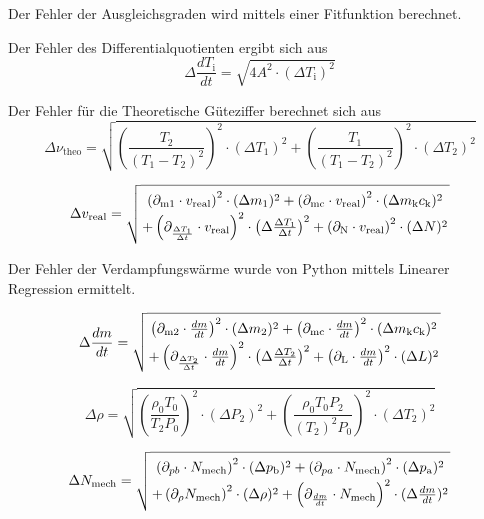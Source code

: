 Der Fehler der Ausgleichsgraden wird mittels einer Fitfunktion berechnet.

Der Fehler des Differentialquotienten ergibt sich aus
\begin{equation}
  \Delta \frac{dT_{\text{i}}}{dt} = \sqrt{4A^2 \cdot \left( \Delta T_{\text{i}} \right)^2 }
\end{equation}

Der Fehler für die Theoretische Güteziffer berechnet sich aus
\begin{equation}
  \Delta \nu_{\text{theo}} = \sqrt{\left( \frac{T_2}{(T_1 - T_2)^2} \right)^2 \cdot (\Delta T_1)^2 + \left( \frac{T_1}{(T_1 - T_2)^2} \right)^2 \cdot (\Delta T_2)^2}
\end{equation}

\begin{equation}
    \Delta v_{\text{real}} = \sqrt{ \left( \partial_{\text{m1}} \cdot v_{\text{real}} \right)^2 \cdot (\Delta m_1)^2 + \left( \partial_{\text{mc}} \cdot v_{\text{real}} \right)^2 \cdot (\Delta m_{\text{k}} c_{\text{k}})^2  \atop + \left( \partial_{\frac{\Delta T_1}{\Delta t}} \cdot v_{\text{real}} \right)^2 \cdot \left( \Delta \frac{\Delta T_1}{\Delta t} \right)^2 + \left( \partial_{\text{N}} \cdot v_{\text{real}} \right)^2 \cdot (\Delta N)^2}
\end{equation}

Der Fehler der Verdampfungswärme wurde von Python mittels Linearer Regression ermittelt.

\begin{equation}
  \Delta \frac{dm}{dt} = \sqrt{ \left( \partial_{\text{m2}} \cdot \frac{dm}{dt} \right)^2 \cdot (\Delta m_2)^2 + \left( \partial_{\text{mc}} \cdot \frac{dm}{dt} \right)^2 \cdot (\Delta m_{\text{k}} c_{\text{k}})^2  \atop + \left( \partial_{\frac{\Delta T_2}{\Delta t}} \cdot \frac{dm}{dt} \right)^2 \cdot \left( \Delta \frac{\Delta T_2}{\Delta t} \right)^2 + \left( \partial_{\text{L}} \cdot \frac{dm}{dt} \right)^2 \cdot (\Delta L)^2}
\end{equation}

\begin{equation}
  \Delta \rho = \sqrt{ \left( \frac{\rho_0 T_0}{T_2 P_0} \right)^2 \cdot (\Delta P_2)^2 + \left( \frac{\rho_0 T_0 P_2}{(T_2)^2 P_0} \right)^2 \cdot (\Delta T_2)^2}
\end{equation}

\begin{equation}
  \Delta N_\text{mech} = \sqrt{ \left( \partial_{pb} \cdot N_\text{mech} \right)^2 \cdot 
  (\Delta p_{\text{b}})^2 + \left( \partial_{pa} \cdot N_\text{mech} \right)^2 \cdot
  (\Delta p_{\text{a}})^2 \atop + \left( \partial_{\rho} N_\text{mech} \right)^2 \cdot (\Delta \rho)^2 
  + \left( \partial_{\frac{dm}{dt}} \cdot N_{\text{mech}} \right)^2 \cdot (\Delta \frac{dm}{dt})^2}
\end{equation}

